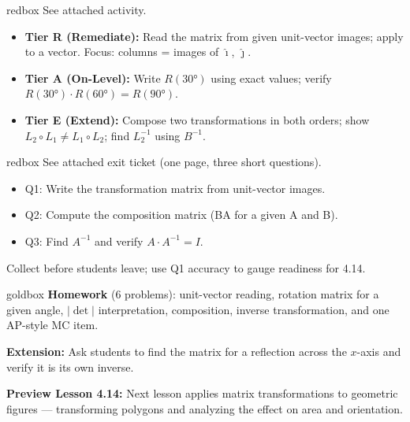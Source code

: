 \documentclass[10pt]{article}
\begin{document}
\begin{skillbox}{redbox}
See attached activity.
\begin{itemize}[leftmargin=1.4em, itemsep=3pt]
  \item \textbf{Tier R (Remediate):} Read the matrix from given unit-vector images; apply to a vector.
        Focus: columns = images of $\hat{\imath}$, $\hat{\jmath}$.
  \item \textbf{Tier A (On-Level):} Write $R(30°)$ using exact values; verify $R(30°)\cdot R(60°) = R(90°)$.
  \item \textbf{Tier E (Extend):} Compose two transformations in both orders; show $L_2\circ L_1 \ne L_1\circ L_2$;
        find $L_2^{-1}$ using $B^{-1}$.
\end{itemize}
\end{skillbox}

\begin{skillbox}{redbox}
See attached exit ticket (one page, three short questions).
\begin{itemize}[leftmargin=1.4em, itemsep=3pt]
  \item Q1: Write the transformation matrix from unit-vector images.
  \item Q2: Compute the composition matrix (BA for a given A and B).
  \item Q3: Find $A^{-1}$ and verify $A\cdot A^{-1}=I$.
\end{itemize}
Collect before students leave; use Q1 accuracy to gauge readiness for 4.14.
\end{skillbox}

\begin{skillbox}{goldbox}
\textbf{Homework} (6 problems): unit-vector reading, rotation matrix for a given angle,
$|\det|$ interpretation, composition, inverse transformation, and one AP-style MC item.

\textbf{Extension:} Ask students to find the matrix for a reflection across the $x$-axis
and verify it is its own inverse.

\textbf{Preview Lesson 4.14:} Next lesson applies matrix transformations to geometric figures
--- transforming polygons and analyzing the effect on area and orientation.
\end{skillbox}
\end{document}
